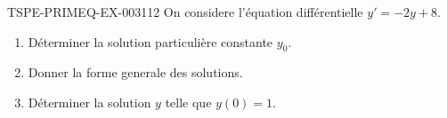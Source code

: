 \begin{exercice}{TSPE-PRIMEQ-EX-003}{1}{12}
On considere l'équation différentielle $y' = -2y + 8$.
\begin{enumerate}
  \item Déterminer la solution particulière constante $y_0$.
  \item Donner la forme generale des solutions.
  \item Déterminer la solution $y$ telle que $y(0) = 1$.
\end{enumerate}
\end{exercice}
